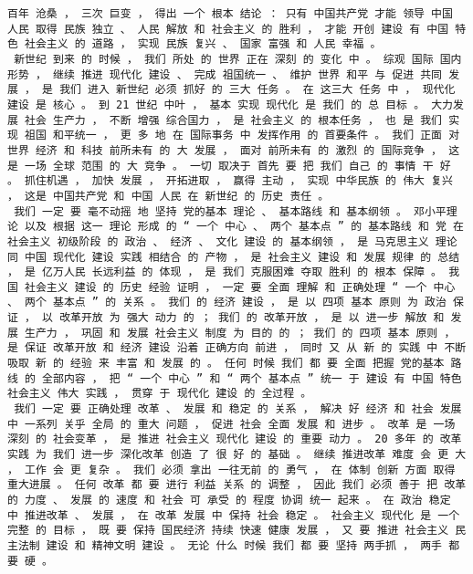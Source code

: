 \documentclass{article}
\begin{document}
\begin{Verbatim}[commandchars=\\\{\}]
 百年 沧桑 ， 三次 巨变 ， 得出 一个 根本 结论 ： 只有 中国共产党 才能 领导 中国 人民 取得 民族 独立 、 人民 解放 和 社会主义 的 胜利 ， 才能 开创 建设 有 中国 特色 社会主义 的 道路 ， 实现 民族 复兴 、 国家 富强 和 人民 幸福 。 
 新世纪 到来 的 时候 ， 我们 所处 的 世界 正在 深刻 的 变化 中 。 综观 国际 国内形势 ， 继续 推进 现代化 建设 、 完成 祖国统一 、 维护 世界 和平 与 促进 共同 发展 ， 是 我们 进入 新世纪 必须 抓好 的 三大 任务 。 在 这三大 任务 中 ， 现代化 建设 是 核心 。 到 21 世纪 中叶 ， 基本 实现 现代化 是 我们 的 总 目标 。 大力发展 社会 生产力 ， 不断 增强 综合国力 ， 是 社会主义 的 根本任务 ， 也 是 我们 实现 祖国 和平统一 ， 更 多 地 在 国际事务 中 发挥作用 的 首要条件 。 我们 正面 对 世界 经济 和 科技 前所未有 的 大 发展 ， 面对 前所未有 的 激烈 的 国际竞争 ， 这是 一场 全球 范围 的 大 竞争 。 一切 取决于 首先 要 把 我们 自己 的 事情 干 好 。 抓住机遇 ， 加快 发展 ， 开拓进取 ， 赢得 主动 ， 实现 中华民族 的 伟大 复兴 ， 这是 中国共产党 和 中国 人民 在 新世纪 的 历史 责任 。 
 我们 一定 要 毫不动摇 地 坚持 党的基本 理论 、 基本路线 和 基本纲领 。 邓小平理论 以及 根据 这一 理论 形成 的 “ 一个 中心 、 两个 基本点 ” 的 基本路线 和 党 在 社会主义 初级阶段 的 政治 、 经济 、 文化 建设 的 基本纲领 ， 是 马克思主义 理论 同 中国 现代化 建设 实践 相结合 的 产物 ， 是 社会主义 建设 和 发展 规律 的 总结 ， 是 亿万人民 长远利益 的 体现 ， 是 我们 克服困难 夺取 胜利 的 根本 保障 。 我国 社会主义 建设 的 历史 经验 证明 ， 一定 要 全面 理解 和 正确处理 “ 一个 中心 、 两个 基本点 ” 的 关系 。 我们 的 经济 建设 ， 是 以 四项 基本 原则 为 政治 保证 ， 以 改革开放 为 强大 动力 的 ； 我们 的 改革开放 ， 是 以 进一步 解放 和 发展 生产力 ， 巩固 和 发展 社会主义 制度 为 目的 的 ； 我们 的 四项 基本 原则 ， 是 保证 改革开放 和 经济 建设 沿着 正确方向 前进 ， 同时 又 从 新 的 实践 中 不断 吸取 新 的 经验 来 丰富 和 发展 的 。 任何 时候 我们 都 要 全面 把握 党的基本 路线 的 全部内容 ， 把 “ 一个 中心 ” 和 “ 两个 基本点 ” 统一 于 建设 有 中国 特色 社会主义 伟大 实践 ， 贯穿 于 现代化 建设 的 全过程 。 
 我们 一定 要 正确处理 改革 、 发展 和 稳定 的 关系 ， 解决 好 经济 和 社会 发展 中 一系列 关乎 全局 的 重大 问题 ， 促进 社会 全面 发展 和 进步 。 改革 是 一场 深刻 的 社会变革 ， 是 推进 社会主义 现代化 建设 的 重要 动力 。 20 多年 的 改革 实践 为 我们 进一步 深化改革 创造 了 很 好 的 基础 。 继续 推进改革 难度 会 更 大 ， 工作 会 更 复杂 。 我们 必须 拿出 一往无前 的 勇气 ， 在 体制 创新 方面 取得 重大进展 。 任何 改革 都 要 进行 利益 关系 的 调整 ， 因此 我们 必须 善于 把 改革 的 力度 、 发展 的 速度 和 社会 可 承受 的 程度 协调 统一 起来 。 在 政治 稳定 中 推进改革 、 发展 ， 在 改革 发展 中 保持 社会 稳定 。 社会主义 现代化 是 一个 完整 的 目标 ， 既 要 保持 国民经济 持续 快速 健康 发展 ， 又 要 推进 社会主义 民主法制 建设 和 精神文明 建设 。 无论 什么 时候 我们 都 要 坚持 两手抓 ， 两手 都 要 硬 。 

\end{Verbatim}
\end{document}
